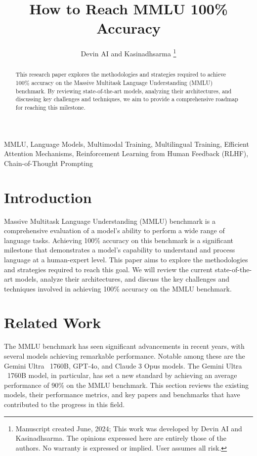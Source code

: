 \documentclass[journal]{IEEEtran}
\begin{document}
\title{How to Reach MMLU 100\% Accuracy}
\author{Devin AI and Kasinadhsarma
\thanks{Manuscript created June, 2024; This work was developed by Devin AI and Kasinadhsarma. The opinions expressed here are entirely those of the authors. No warranty is expressed or implied. User assumes all risk.}}

\maketitle

\begin{abstract}
This research paper explores the methodologies and strategies required to achieve 100\% accuracy on the Massive Multitask Language Understanding (MMLU) benchmark. By reviewing state-of-the-art models, analyzing their architectures, and discussing key challenges and techniques, we aim to provide a comprehensive roadmap for reaching this milestone.
\end{abstract}

\begin{IEEEkeywords}
MMLU, Language Models, Multimodal Training, Multilingual Training, Efficient Attention Mechanisms, Reinforcement Learning from Human Feedback (RLHF), Chain-of-Thought Prompting
\end{IEEEkeywords}

\section{Introduction}
 Massive Multitask Language Understanding (MMLU) benchmark is a comprehensive evaluation of a model's ability to perform a wide range of language tasks. Achieving 100\% accuracy on this benchmark is a significant milestone that demonstrates a model's capability to understand and process language at a human-expert level. This paper aims to explore the methodologies and strategies required to reach this goal. We will review the current state-of-the-art models, analyze their architectures, and discuss the key challenges and techniques involved in achieving 100\% accuracy on the MMLU benchmark.

\section{Related Work}
The MMLU benchmark has seen significant advancements in recent years, with several models achieving remarkable performance. Notable among these are the Gemini Ultra ~1760B, GPT-4o, and Claude 3 Opus models. The Gemini Ultra ~1760B model, in particular, has set a new standard by achieving an average performance of 90\% on the MMLU benchmark. This section reviews the existing models, their performance metrics, and key papers and benchmarks that have contributed to the progress in this field.
\end{document}
